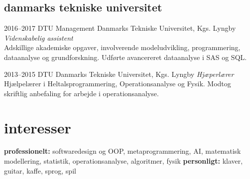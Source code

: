 \documentclass[]{../friggeri-cv} %
\begin{document}
\subsection{danmarks tekniske universitet}

\begin{entrylist}

\entry
{2016--2017}
{DTU Management}
{Danmarks Tekniske Universitet, Kgs. Lyngby}
{\emph{Videnskabelig assistent}\\
Adskillige akademiske opgaver, involverende modeludvikling, programmering, dataanalyse og grundforskning. Udførte avancereret dataanalyse i SAS og SQL.}

\entry
{2013--2015}
{DTU}
{Danmarks Tekniske Universitet, Kgs. Lyngby}
{\emph{Hjæperlærer}\\
Hjælpelærer i Heltalsprogrammering, Operationsanalyse og Fysik. Modtog skriftlig anbefaling for arbejde i operationsanalyse.}

\end{entrylist}


\section{interesser}
\textbf{professionelt:} softwaredesign og OOP, metaprogrammering, AI, matematisk modellering, statistik, operationsanalyse,  algoritmer, fysik
\textbf{personligt:} klaver, guitar, kaffe, sprog, spil
%
%
%
%
%
%
%
%
%
\end{document}
